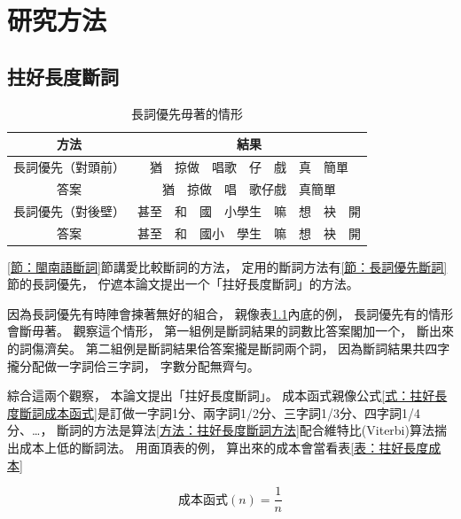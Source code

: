 \chapter{研究方法}
\label{章：研究方法}

\section{拄好長度斷詞}
\label{節：拄好長度斷詞}

\begin{table}
\caption{長詞優先毋著的情形}
\label{表：長詞優先佇一寡例有問題}
\centering
\begin{tabular}{c|c}
方法 & 結果\\
\hline
長詞優先（對頭前） & 猶　掠做　唱歌　仔　戲　真　簡單\\
答案 & 猶　掠做　唱　歌仔戲　真簡單\\
\hline
長詞優先（對後壁） & 甚至　和　國　小學生　嘛　想　袂　開\\
答案 & 甚至　和　國小　學生　嘛　想　袂　開\\
\end{tabular}
\end{table}

\ref{節：閩南語斷詞}節講愛比較斷詞的方法，
定用的斷詞方法有\ref{節：長詞優先斷詞}節的長詞優先，
佇遮本論文提出一个「拄好長度斷詞」的方法。


因為長詞優先有時陣會揀著無好的組合，
親像表\ref{表：長詞優先佇一寡例有問題}內底的例，
長詞優先有的情形會斷毋著。
觀察這个情形，
第一組例是斷詞結果的詞數比答案閣加一个，
斷出來的詞傷濟矣。
第二組例是斷詞結果佮答案攏是斷詞兩个詞，
因為斷詞結果共四字攏分配做一字詞佮三字詞，
字數分配無齊勻。

綜合這兩个觀察，
本論文提出「拄好長度斷詞」。
成本函式親像公式\ref{式：拄好長度斷詞成本函式}是訂做一字詞1分、兩字詞1/2分、三字詞1/3分、四字詞1/4分、…，
斷詞的方法是算法\ref{方法：拄好長度斷詞方法}配合維特比(Viterbi)算法揣出成本上低的斷詞法。
用面頂表的例，
算出來的成本會當看表\ref{表：拄好長度成本}

\begin{equation}
\label{式：拄好長度斷詞成本函式}
成本函式(n) = \frac{1}{n}
\end{equation}

